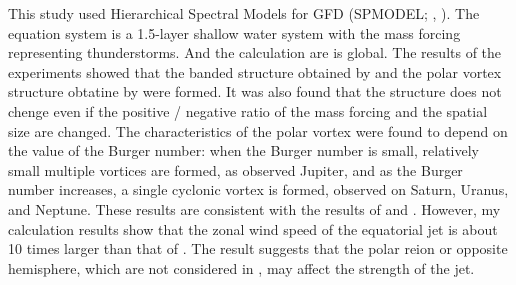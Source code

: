 \documentclass[a4j,12pt,openbib,oneside]{jreport}
\begin{document}
This study used Hierarchical Spectral Models for GFD (SPMODEL; \cite{spmodel2006}, \cite{spmodel2013}).
%
The equation system is a 1.5-layer shallow water system
with the mass forcing representing thunderstorms.
And the calculation are is global.
%
The results of the experiments showed 
that the banded structure obtained by \cite{Showman2007} and 
the polar vortex structure obtatine by \cite{Brueshaber2019} were formed.
%
It was also found that the structure does not chenge even if the positive / negative 
ratio of the mass forcing and the spatial size are changed.
%
The characteristics of the polar vortex were 
found to depend on the value of the Burger number:
when the Burger number is small, 
relatively small multiple vortices are formed, as observed Jupiter,
and as the Burger number increases, 
a single cyclonic vortex is formed, observed on Saturn, Uranus, and Neptune.
%
These results are consistent with the results of \cite{Showman2007} and \cite{Brueshaber2019}.
%
However, my calculation results show that 
the zonal wind speed of the equatorial jet is 
about 10 times larger than that of \cite{Showman2007}.
%
The result suggests that the polar reion or opposite hemisphere,
which are not considered in \cite{Showman2007}, may affect the strength of the jet.
%


\end{document}
